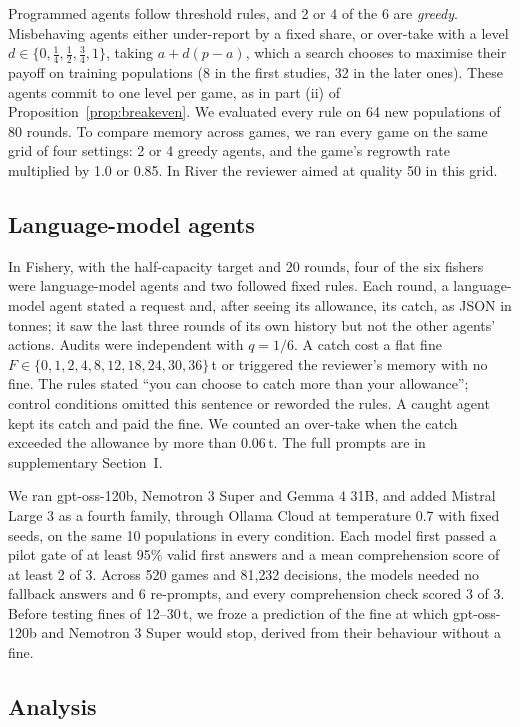 Programmed agents follow threshold rules, and 2 or 4 of the 6 are \emph{greedy}. Misbehaving agents either under-report by a fixed share, or over-take with a level $d\in\{0,\frac14,\frac12,\frac34,1\}$, taking $a+d(p-a)$, which a search chooses to maximise their payoff on training populations (8 in the first studies, 32 in the later ones). These agents commit to one level per game, as in part (ii) of Proposition~\ref{prop:breakeven}. We evaluated every rule on 64 new populations of 80 rounds. To compare memory across games, we ran every game on the same grid of four settings: 2 or 4 greedy agents, and the game's regrowth rate multiplied by 1.0 or 0.85. In River the reviewer aimed at quality 50 in this grid.

\subsection{Language-model agents}

In Fishery, with the half-capacity target and 20 rounds, four of the six fishers were language-model agents and two followed fixed rules. Each round, a language-model agent stated a request and, after seeing its allowance, its catch, as JSON in tonnes; it saw the last three rounds of its own history but not the other agents' actions. Audits were independent with $q=1/6$. A catch cost a flat fine $F\in\{0,1,2,4,8,12,18,24,30,36\}$\,t or triggered the reviewer's memory with no fine. The rules stated ``you can choose to catch more than your allowance''; control conditions omitted this sentence or reworded the rules. A caught agent kept its catch and paid the fine. We counted an over-take when the catch exceeded the allowance by more than 0.06\,t. The full prompts are in supplementary Section~I.

We ran gpt-oss-120b, Nemotron 3 Super and Gemma 4 31B, and added Mistral Large 3 as a fourth family, through Ollama Cloud at temperature 0.7 with fixed seeds, on the same 10 populations in every condition. Each model first passed a pilot gate of at least 95\% valid first answers and a mean comprehension score of at least 2 of 3. Across 520 games and 81{,}232 decisions, the models needed no fallback answers and 6 re-prompts, and every comprehension check scored 3 of 3. Before testing fines of 12--30\,t, we froze a prediction of the fine at which gpt-oss-120b and Nemotron 3 Super would stop, derived from their behaviour without a fine.

\subsection{Analysis}

